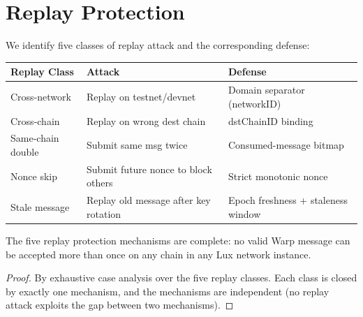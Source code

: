 \section{Replay Protection}
\label{sec:replay}

We identify five classes of replay attack and the corresponding defense:

\begin{center}
\begin{tabular}{lll}
\toprule
\textbf{Replay Class} & \textbf{Attack} & \textbf{Defense} \\
\midrule
Cross-network & Replay on testnet/devnet & Domain separator (networkID) \\
Cross-chain & Replay on wrong dest chain & dstChainID binding \\
Same-chain double & Submit same msg twice & Consumed-message bitmap \\
Nonce skip & Submit future nonce to block others & Strict monotonic nonce \\
Stale message & Replay old message after key rotation & Epoch freshness + staleness window \\
\bottomrule
\end{tabular}
\end{center}

\begin{theorem}
The five replay protection mechanisms are complete: no valid Warp message can be accepted more than once on any chain in any Lux network instance.
\end{theorem}

\begin{proof}
By exhaustive case analysis over the five replay classes. Each class is closed by exactly one mechanism, and the mechanisms are independent (no replay attack exploits the gap between two mechanisms).
\end{proof}

